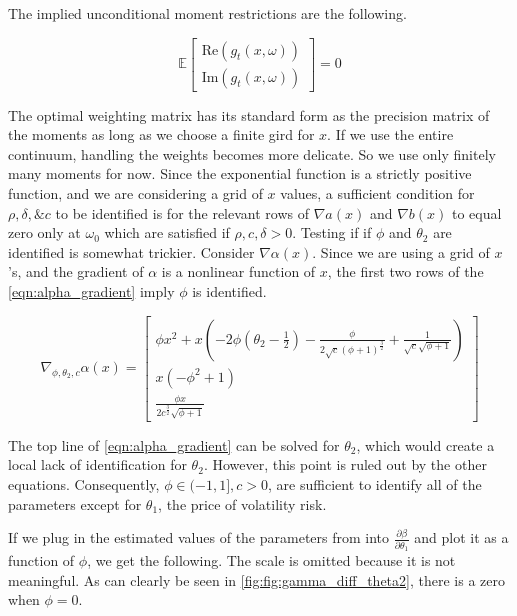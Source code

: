 \documentclass[11pt]{article}
\newcommand*{\E}{\mathbb{E}}
\begin{document}
The implied unconditional moment restrictions are the following.  

\begin{equation}
    \E \begin{bmatrix}  \mathrm{Re} (g_t(x, \omega)) \\ \mathrm{Im} (g_t(x, \omega)) \end{bmatrix} = 0
\end{equation}


The optimal weighting matrix has its standard form as the precision matrix of the moments as long as we choose a
finite gird for $x$. 
If we use the entire continuum, handling the weights becomes more delicate. 
So we use only finitely many moments for now.
Since the exponential function is a strictly positive function, and we are considering a grid of $x$ values, a
sufficient condition for $\rho, \delta, \& c$ to be identified is for the relevant rows of $\nabla a(x)$ and
$\nabla b(x)$ to equal zero only at $\omega_0$ which are satisfied if $\rho, c, \delta > 0$.
Testing if if $\phi$ and $\theta_2$ are identified is somewhat trickier. 
Consider $\nabla \alpha(x)$. 
Since we are using a grid of $x$'s, and the gradient of $\alpha$ is a
nonlinear function of $x$, the first two rows of the \cref{eqn:alpha_gradient} imply $\phi$ is identified.

\begin{equation}
    \label{eqn:alpha_gradient}
    \nabla_{\phi, \theta_2, c}  \alpha(x) = \begin{bmatrix} \phi x^{2} + x \left(- 2 \phi \left(\theta_{2} -
    \frac{1}{2}\right) - \frac{\phi}{2 \sqrt{c} \left(\phi + 1\right)^{\frac{3}{2}}} + \frac{1}{\sqrt{c}
    \sqrt{\phi + 1}}\right) \\ x \left(- \phi^{2} + 1\right) \\ \frac{\phi x}{2 c^{\frac{3}{2}} \sqrt{\phi + 1}}
\end{bmatrix} 
\end{equation}

The top line of \cref{eqn:alpha_gradient} can be solved for $\theta_2$, which would create a local lack of
identification for $\theta_2$.
However, this point is ruled out by the other equations.
Consequently,  $\phi \in (-1,1], c > 0$, are sufficient to identify all of the parameters except for $\theta_1$,
the price of volatility risk.

If we plug in the estimated values of the parameters from \textcite{khrapov2016affine} into $\frac{\partial
\beta}{\partial \theta_1}$ and plot it as a function of $\phi$,  we get the following.
The scale is omitted because it is not meaningful. 
As can clearly be seen in \cref{fig:fig:gamma_diff_theta2}, there is a zero when $\phi = 0$.
\end{document}
